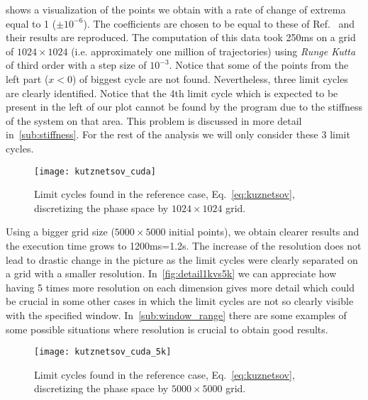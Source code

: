 \pagebreak
{} shows a visualization of the points we obtain with a rate of change of extrema equal to 1 ($\pm 10^{-6}$). The coefficients are chosen to be equal to these of Ref.~\cite{kuznetsov_visualization_2013} and their results are reproduced. The computation of this data took 250ms on a grid of $1024 \times 1024$ (i.e. approximately one million of trajectories) using \emph{Runge Kutta} of third order with a step size of $10^{-3}$.
Notice that some of the points from the left part ($x < 0$) of biggest cycle are not found.
Nevertheless, three limit cycles are clearly identified. Notice that the
4th limit cycle which is expected to be present in the left of our plot cannot be found by the program due to the stiffness of the system on that area. This problem is discussed in more detail in~\cref{sub:stiffness}. For the rest of the analysis we will only consider these 3 limit cycles.
\begin{figure}[H]
    \centering
    \texttt{[image: kutznetsov\_cuda]}
    \caption{Limit cycles found in the reference case, Eq.~\ref{eq:kuznetsov}, discretizing the phase space by $1024\times 1024$ grid.
    }
    \label{fig:kuznetsov_cuda}
\end{figure}

Using a bigger grid size ($5000\times5000$ initial points), we obtain clearer results and the execution time grows to 1200ms=1.2s.
The increase of the resolution does not lead to drastic change in the picture as
the limit cycles were clearly separated on a grid with a smaller resolution.
In~\cref{fig:detail1kvs5k} we can appreciate how having 5 times more resolution on each dimension
gives more detail which could be crucial
in some other cases in which the limit cycles are not so clearly visible with the specified window.
In~\cref{sub:window_range} there are some examples of some possible situations where resolution is crucial to obtain good results.

\begin{figure}[H]
\centering
\texttt{[image: kutznetsov\_cuda\_5k]}
\caption{Limit cycles found in the reference case, Eq.~\ref{eq:kuznetsov}, discretizing the phase space by $5000\times 5000$ grid.
}
\label{fig:kuznetsov_cuda_5k}
\end{figure}

